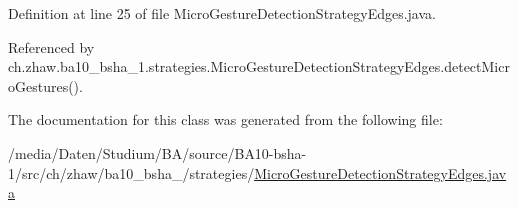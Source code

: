 Definition at line 25 of file MicroGestureDetectionStrategyEdges.java.

Referenced by ch.zhaw.ba10\_\-bsha\_\-1.strategies.MicroGestureDetectionStrategyEdges.detectMicroGestures().

The documentation for this class was generated from the following file:\begin{DoxyCompactItemize}
\item 
/media/Daten/Studium/BA/source/BA10-\/bsha-\/1/src/ch/zhaw/ba10\_\-bsha\_/strategies/\hyperlink{MicroGestureDetectionStrategyEdges_8java}{MicroGestureDetectionStrategyEdges.java}\end{DoxyCompactItemize}
